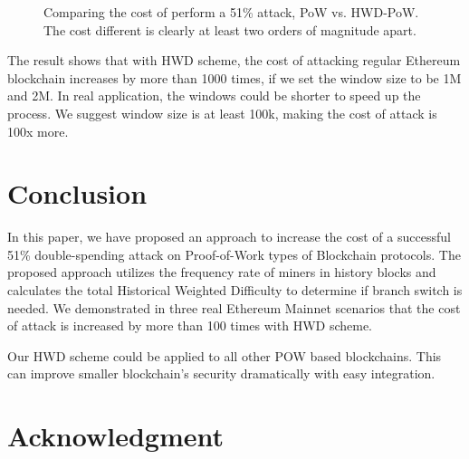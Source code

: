 \documentclass[conference]{IEEEtran}
\begin{document}
\begin{figure}[htbp]
\caption{Comparing the cost of perform a 51\% attack, PoW vs. HWD-PoW. The cost different is clearly at least two orders of magnitude apart.}
\label{fig3}
\end{figure}    

The result shows that with HWD scheme, the cost of attacking regular Ethereum blockchain increases by more than 1000 times, if we set the window size to be 1M and 2M. In real application, the windows could be shorter to speed up the process. We suggest window size is at least 100k, making the cost of attack is 100x more.


\section{Conclusion}
 
In this paper, we have proposed an approach to increase the cost of a successful 51\% double-spending attack on Proof-of-Work types of Blockchain protocols. The proposed approach utilizes the frequency rate of miners in history blocks and calculates the total Historical Weighted Difficulty to determine if branch switch is needed. We demonstrated in three real Ethereum Mainnet scenarios that the cost of attack is increased by more than 100 times with HWD scheme.

Our HWD scheme could be applied to all other POW based blockchains. This can improve smaller blockchain's security dramatically with easy integration. 

\section*{Acknowledgment}
\end{document}
